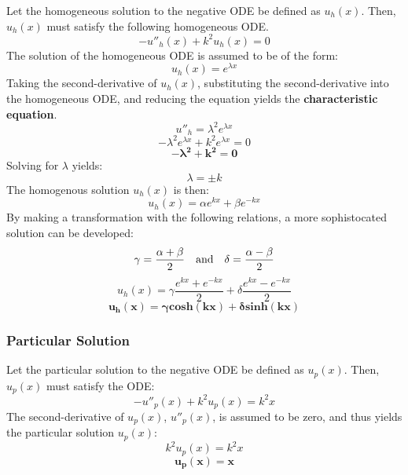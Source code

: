 \documentclass[10pt, reqno]{article}		%
\numberwithin{equation}{section}
\begin{document}
Let the homogeneous solution to the negative ODE be defined as $u_h(x)$. Then, $u_h(x)$ must satisfy the following homogeneous ODE.
\begin{equation}
-u''_h(x) + k^2u_h(x) = 0
\end{equation}
The solution of the homogeneous ODE is assumed to be of the form: 
\begin{equation}
u_h(x) = e^{\lambda x}
\end{equation}
Taking the second-derivative of $u_h(x)$, substituting the second-derivative into the homogeneous ODE, and reducing the equation yields the \textbf{characteristic equation}.
\begin{equation}
u''_h = \lambda^2 e^{\lambda x}
\end{equation}
\begin{equation}
-\lambda^2 e^{\lambda x} + k^2e^{\lambda x} = 0
\end{equation}
\begin{equation}
\mathbf{-\lambda^2 + k^2 = 0}
\end{equation}
Solving for $\lambda$ yields:
\begin{equation}
\lambda = \pm k
\end{equation}
The homogenous solution $u_h(x)$ is then:
\begin{equation}
u_h(x) = \alpha e^{kx} + \beta e^{-kx}
\end{equation}
By making a transformation with the following relations, a more sophistocated solution can be developed:
\begin{equation}
\gamma = \frac{\alpha+\beta}{2} \quad \textnormal{and} \quad \delta = \frac{\alpha-\beta}{2}
\end{equation}
\begin{equation}
u_h(x) = \gamma \frac{e^{kx}+e^{-kx}}{2} + \delta \frac{e^{kx}-e^{-kx}}{2}
\end{equation}
\begin{equation}
\mathbf{u_h(x) = \gamma cosh(kx) + \delta sinh(kx)}
\end{equation}

\subsubsection{Particular Solution}

Let the particular solution to the negative ODE be defined as $u_p(x)$. Then, $u_p(x)$ must satisfy the ODE:
\begin{equation}
-u''_p(x) + k^2u_p(x) = k^2x
\end{equation}
The second-derivative of $u_p(x)$, $u''_p(x)$, is assumed to be zero, and thus yields the particular solution $u_p(x)$:
\begin{equation}
k^2u_p(x) = k^2x
\end{equation}
\begin{equation}
\mathbf{u_p(x) = x}
\end{equation}
\end{document}
